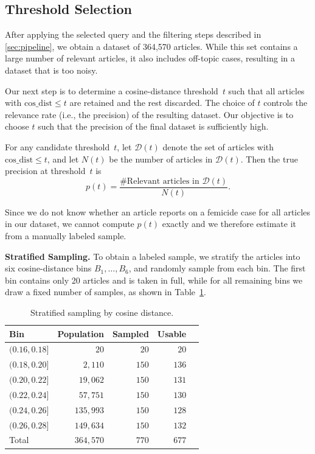 \documentclass{article}
\begin{document}
\subsection{Threshold Selection}
\label{sec:threshold}
After applying the selected query and the filtering steps described in \ref{sec:pipeline}, we obtain a dataset of 364{,}570 articles. While this set contains a large number of relevant articles, it also includes off-topic cases, resulting in a dataset that is too noisy.

Our next step is to determine a cosine-distance threshold~$t$ such that all articles with $\mathrm{cos\_dist} \le t$ are retained and the rest discarded. The choice of $t$ controls the relevance rate (i.e., the precision) of the resulting dataset. Our objective is to choose $t$ such that the precision of the final dataset is sufficiently high.

For any candidate threshold~$t$, let $\mathcal{D}(t)$ denote the set of articles with $\mathrm{cos\_dist} \le t$, and let $N(t)$ be the number of articles in $\mathcal{D}(t)$. Then the true precision at threshold~$t$ is
\[
p(t)
  = \frac{\#\text{Relevant articles in }\mathcal{D}(t)}{N(t)}.
\]

Since we do not know whether an article reports on a femicide case for all articles in our dataset, we cannot compute $p(t)$ exactly and we therefore estimate it from a manually labeled sample.

\textbf{Stratified Sampling.} To obtain a labeled sample, we stratify the articles into six cosine-distance bins $B_1,\dots,B_6$, and randomly sample from each bin. The first bin contains only 20 articles and is taken in full, while for all remaining bins we draw a fixed number of samples, as shown in Table~\ref{tab:sampling_bins}.
\begin{table}[h]
\centering
\small
\caption{Stratified sampling by cosine distance.}
\label{tab:sampling_bins}
\begin{tabular}{lrrrr}
\toprule
Bin & Population & Sampled & Usable \\
\midrule
$(0.16, 0.18]$ & $20$ & $20$ & $20$ \\
$(0.18, 0.20]$ & $2{,}110$ & $150$ & $136$ \\
$(0.20, 0.22]$ & $19{,}062$ & $150$ & $131$ \\
$(0.22, 0.24]$ & $57{,}751$ & $150$ & $130$ \\
$(0.24, 0.26]$ & $135{,}993$ & $150$ & $128$ \\
$(0.26, 0.28]$ & $149{,}634$ & $150$ & $132$ \\
\midrule
Total & $364{,}570$ & $770$ & $677$ \\
\bottomrule
\end{tabular}
\end{table}
\end{document}
